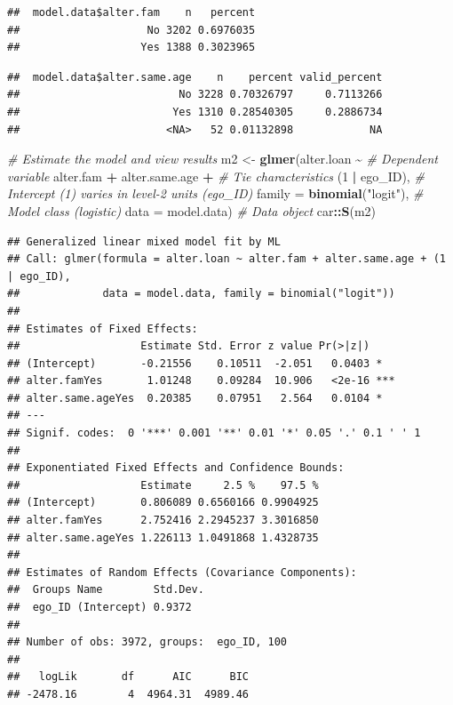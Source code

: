 \documentclass[
]{book}
\newenvironment{Shaded}{\begin{snugshade}}{\end{snugshade}}
\newcommand{\AttributeTok}[1]{\textcolor[rgb]{0.13,0.29,0.53}{#1}}
\newcommand{\CommentTok}[1]{\textcolor[rgb]{0.56,0.35,0.01}{\textit{#1}}}
\newcommand{\DecValTok}[1]{\textcolor[rgb]{0.00,0.00,0.81}{#1}}
\newcommand{\FunctionTok}[1]{\textcolor[rgb]{0.13,0.29,0.53}{\textbf{#1}}}
\newcommand{\NormalTok}[1]{#1}
\newcommand{\OtherTok}[1]{\textcolor[rgb]{0.56,0.35,0.01}{#1}}
\newcommand{\SpecialCharTok}[1]{\textcolor[rgb]{0.81,0.36,0.00}{\textbf{#1}}}
\newcommand{\StringTok}[1]{\textcolor[rgb]{0.31,0.60,0.02}{#1}}
\begin{document}
\begin{verbatim}
##  model.data$alter.fam    n   percent
##                    No 3202 0.6976035
##                   Yes 1388 0.3023965
\end{verbatim}

\begin{Shaded}
\end{Shaded}

\begin{verbatim}
##  model.data$alter.same.age    n    percent valid_percent
##                         No 3228 0.70326797     0.7113266
##                        Yes 1310 0.28540305     0.2886734
##                       <NA>   52 0.01132898            NA
\end{verbatim}

\begin{Shaded}
\begin{Highlighting}[]
\CommentTok{\# Estimate the model and view results}
\NormalTok{m2 }\OtherTok{\textless{}{-}} \FunctionTok{glmer}\NormalTok{(alter.loan }\SpecialCharTok{\textasciitilde{}} \CommentTok{\# Dependent variable}
\NormalTok{              alter.fam }\SpecialCharTok{+}\NormalTok{ alter.same.age }\SpecialCharTok{+} \CommentTok{\# Tie characteristics}
\NormalTok{              (}\DecValTok{1} \SpecialCharTok{|}\NormalTok{ ego\_ID), }\CommentTok{\# Intercept (1) varies in level{-}2 units (ego\_ID)}
            \AttributeTok{family =} \FunctionTok{binomial}\NormalTok{(}\StringTok{"logit"}\NormalTok{), }\CommentTok{\# Model class (logistic)}
            \AttributeTok{data =}\NormalTok{ model.data) }\CommentTok{\# Data object}
\NormalTok{car}\SpecialCharTok{::}\FunctionTok{S}\NormalTok{(m2)}
\end{Highlighting}
\end{Shaded}

\begin{verbatim}
## Generalized linear mixed model fit by ML
## Call: glmer(formula = alter.loan ~ alter.fam + alter.same.age + (1 | ego_ID),
##             data = model.data, family = binomial("logit"))
## 
## Estimates of Fixed Effects:
##                   Estimate Std. Error z value Pr(>|z|)    
## (Intercept)       -0.21556    0.10511  -2.051   0.0403 *  
## alter.famYes       1.01248    0.09284  10.906   <2e-16 ***
## alter.same.ageYes  0.20385    0.07951   2.564   0.0104 *  
## ---
## Signif. codes:  0 '***' 0.001 '**' 0.01 '*' 0.05 '.' 0.1 ' ' 1
## 
## Exponentiated Fixed Effects and Confidence Bounds:
##                   Estimate     2.5 %    97.5 %
## (Intercept)       0.806089 0.6560166 0.9904925
## alter.famYes      2.752416 2.2945237 3.3016850
## alter.same.ageYes 1.226113 1.0491868 1.4328735
## 
## Estimates of Random Effects (Covariance Components):
##  Groups Name        Std.Dev.
##  ego_ID (Intercept) 0.9372  
## 
## Number of obs: 3972, groups:  ego_ID, 100
## 
##   logLik       df      AIC      BIC 
## -2478.16        4  4964.31  4989.46
\end{verbatim}
\end{document}

